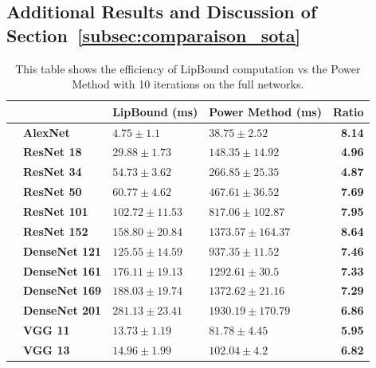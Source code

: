 \subsection{Additional Results and Discussion of Section~\ref{subsec:comparaison_sota}}


\begin{table}[htb]
  \centering
  \caption{This table shows the efficiency of LipBound computation vs the Power Method with 10 iterations on the full networks.}
  {\footnotesize
    \begin{tabular}{llllr}
    \toprule
      &   & \multicolumn{1}{c}{\textbf{LipBound (ms)}} & \multicolumn{1}{c}{\textbf{Power Method (ms)}} & \textbf{Ratio} \\
    \midrule
     \cite{krizhevsky2012imagenet} & \textbf{AlexNet} & \phantom{....}$4.75\pm1.1$ & \phantom{....}$38.75\pm2.52$ & \textbf{8.14 }\\
    \midrule
    \multirow{5}[2]{*}{\cite{he2016deep}} & \textbf{ResNet 18} & \phantom{..}$29.88\pm1.73$ & \phantom{..}$148.35\pm14.92$ & \textbf{4.96 }\\
      & \textbf{ResNet 34} & \phantom{..}$54.73\pm3.62$ & \phantom{..}$266.85\pm25.35$ & \textbf{4.87 }\\
      & \textbf{ResNet 50} & \phantom{..}$60.77\pm4.62$ & \phantom{..}$467.61\pm36.52$ & \textbf{7.69 }\\
      & \textbf{ResNet 101} & $102.72\pm11.53$ & \phantom{..}$817.06\pm102.87$ & \textbf{7.95 }\\
      & \textbf{ResNet 152} & $158.80\pm20.84$ & $1373.57\pm164.37$ & \textbf{8.64} \\
    \midrule
    \multirow{4}[2]{*}{\cite{huang2017densely}} & \textbf{DenseNet 121} & $125.55\pm14.59$ & \phantom{..}$937.35\pm11.52$ & \textbf{7.46 }\\
      & \textbf{DenseNet 161} & $176.11\pm19.13$ & $1292.61\pm30.5$ & \textbf{7.33} \\
      & \textbf{DenseNet 169} & $188.03\pm19.74$ & $1372.62\pm21.16$ & \textbf{7.29} \\
      & \textbf{DenseNet 201} & $281.13\pm23.41$ & $1930.19\pm170.79$ & \textbf{6.86 }\\
    \midrule
    \multirow{4}[2]{*}{\cite{simonyan2014very}} & \textbf{VGG 11} & \phantom{..}$13.73\pm1.19$ & \phantom{....}$81.78\pm4.45$ & \textbf{5.95 }\\
      & \textbf{VGG 13} & \phantom{..}$14.96\pm1.99$ & \phantom{..}$102.04\pm4.2$ & \textbf{6.82 }\\

\end{tabular}}
\end{table}
